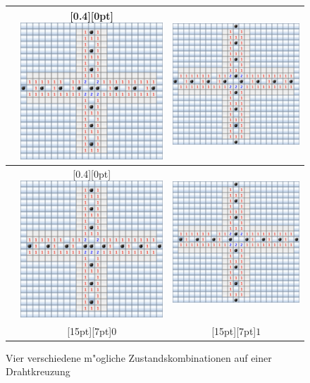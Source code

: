 \begin{figure}
\begin{center}
\begin{tabular}{|l|c|c|}
\hline
\raisebox{12ex}{$0$}&
\raisebox{0pt}[0.4\hsize][0pt]{%
\includegraphics[width=0.41\hsize]{graphics/cross-11}}&
\includegraphics[width=0.41\hsize]{graphics/cross-10}\\
\hline
\raisebox{12ex}{$1$}&
\raisebox{0pt}[0.4\hsize][0pt]{%
\includegraphics[width=0.41\hsize]{graphics/cross-01}}&
\includegraphics[width=0.41\hsize]{graphics/cross-00}\\
\hline
&\raisebox{0pt}[15pt][7pt]{$0$}&%
\raisebox{0pt}[15pt][7pt]{$1$}\\
\hline
\end{tabular}
\end{center}
\caption{Vier verschiedene m"ogliche Zustandskombinationen auf
einer Drahtkreuzung\label{minesweeper-crosses}}
\end{figure}%

